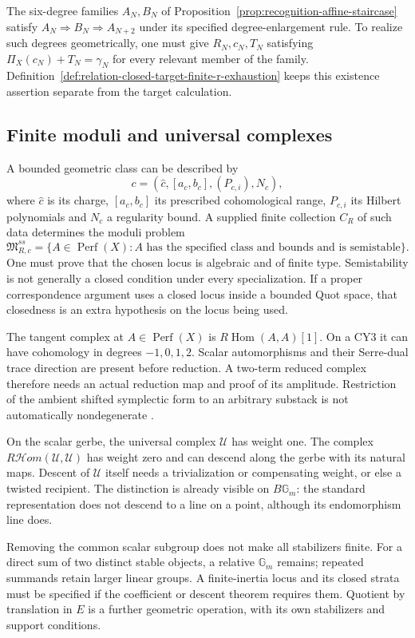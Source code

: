 The six-degree families \(A_N,B_N\) of
Proposition~\ref{prop:recognition-affine-staircase} satisfy
\(A_N\Rightarrow B_N\Rightarrow A_{N+2}\) under its specified
degree-enlargement rule. To realize such degrees geometrically,
one must give
\(R_N,c_N,T_N\) satisfying
\(\Pi_X(c_N)+T_N=\gamma_N\) for every relevant member of the
family. Definition~\ref{def:relation-closed-target-finite-r-exhaustion}
keeps this existence assertion separate from the target calculation.

\subsection{Finite moduli and universal complexes}
\label{app:build-finite-moduli}

A bounded geometric class can be described by
\[
 c=(\widehat c,[a_c,b_c],(P_{c,i}),N_c),
\]
where \(\widehat c\) is its charge, \([a_c,b_c]\) its prescribed
cohomological range, \(P_{c,i}\) its Hilbert polynomials and
\(N_c\) a regularity bound. A supplied finite collection \(C_R\)
of such data determines the moduli problem
\[
 \mathfrak M^{ss}_{R,c}
 =\{A\in\operatorname{Perf}(X):
   A\text{ has the specified class and bounds and is semistable}\}.
\]
One must prove that the chosen locus is algebraic and of finite
type. Semistability is not generally a closed condition under every
specialization. If a proper correspondence argument uses a closed
locus inside a bounded Quot space, that closedness is an extra
hypothesis on the locus being used.

The tangent complex at \(A\in\operatorname{Perf}(X)\) is
\(R\operatorname{Hom}(A,A)[1]\). On a CY3 it can have cohomology
in degrees \(-1,0,1,2\). Scalar automorphisms and their Serre-dual
trace direction are present before reduction. A two-term reduced
complex therefore needs an actual reduction map and proof of its
amplitude. Restriction of the ambient shifted symplectic form to an
arbitrary substack is not automatically nondegenerate
\cite{PTVV2013}.

On the scalar gerbe, the universal complex \(\mathcal U\) has
weight one. The complex
\(R\mathcal Hom(\mathcal U,\mathcal U)\) has weight zero and
can descend along the gerbe with its natural maps. Descent of
\(\mathcal U\) itself needs a trivialization or compensating
weight, or else a twisted recipient. The distinction is already
visible on \(B\mathbb G_m\): the standard representation does
not descend to a line on a point, although its endomorphism line
does.

Removing the common scalar subgroup does not make all stabilizers
finite. For a direct sum of two distinct stable objects, a relative
\(\mathbb G_m\) remains; repeated summands retain larger linear
groups. A finite-inertia locus and its closed strata must be
specified if the coefficient or descent theorem requires them.
Quotient by translation in \(E\) is a further geometric operation,
with its own stabilizers and support conditions.


